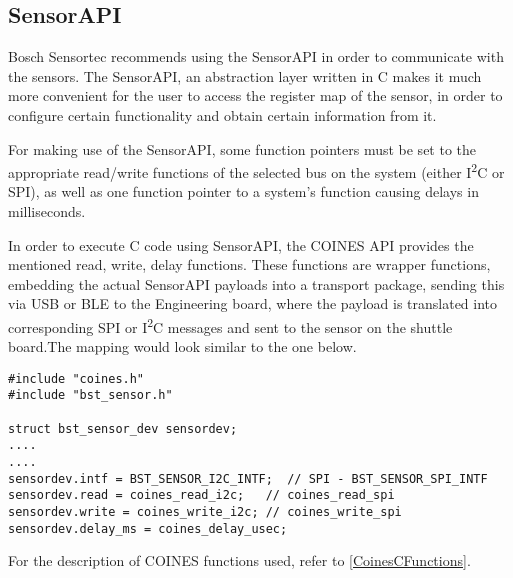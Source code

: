 \documentclass{article}
\begin{document}
\subsection{SensorAPI}
Bosch Sensortec recommends using the SensorAPI in order to communicate with the sensors. The SensorAPI, an abstraction layer written in C makes it much more convenient for the user to access the register map of the sensor, in order to configure certain functionality and obtain certain information from it.

For making use of the SensorAPI, some function pointers must be set to the appropriate read/write functions of the selected bus on the system (either I\textsuperscript{2}C or SPI), as well as one function pointer to a system's function causing delays in milliseconds.

In order to execute C code using SensorAPI, the COINES API provides the mentioned read, write, delay functions. These functions are wrapper functions, embedding the actual SensorAPI payloads into a transport package, sending this via USB or BLE to the Engineering board, where the payload is translated into corresponding SPI or I\textsuperscript{2}C messages and sent to the sensor on the shuttle board.The mapping would look similar to the one below.

\begin{lstlisting}
#include "coines.h"
#include "bst_sensor.h"

struct bst_sensor_dev sensordev;
....
....
sensordev.intf = BST_SENSOR_I2C_INTF;  // SPI - BST_SENSOR_SPI_INTF
sensordev.read = coines_read_i2c;   // coines_read_spi
sensordev.write = coines_write_i2c; // coines_write_spi
sensordev.delay_ms = coines_delay_usec;

\end{lstlisting}

For the description of COINES functions used, refer to \ref{CoinesCFunctions}.
\end{document}
